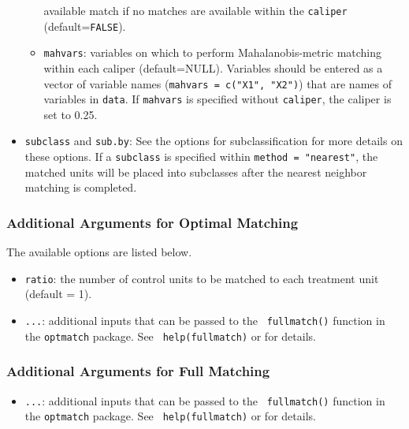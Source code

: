 \begin{itemize}
\begin{itemize}
    available match if no matches are available within the
    \texttt{caliper} (default={\tt FALSE}).
  \item \texttt{mahvars}: variables on which to perform
    Mahalanobis-metric matching within each caliper (default=NULL).
    Variables should be entered as a vector of variable names
    (\texttt{mahvars = c("X1", "X2")}) that are names of variables in
    \texttt{data}.  If \texttt{mahvars} is specified without
    \texttt{caliper}, the caliper is set to 0.25.
  \end{itemize}
\item \texttt{subclass} and \texttt{sub.by}: See the options for
  subclassification for more details on these options.  If a
  \texttt{subclass} is specified within \texttt{method = "nearest"},
  the matched units will be placed into subclasses after the nearest
  neighbor matching is completed.
\end{itemize}

\subsubsection{Additional Arguments for Optimal Matching}
\label{subsubsec:inputs-optimal}

The available options are listed below.
\begin{itemize}
\item {\tt ratio}: the number of control units to be matched
  to each treatment unit (default = 1).
\item {\tt ...}: additional inputs that can be passed to the {\tt
    fullmatch()} function in the {\tt optmatch} package. See {\tt
    help(fullmatch)} or
  for details.
\end{itemize}

\subsubsection{Additional Arguments for Full Matching}
\label{subsubsec:inputs-full}

\begin{itemize}
\item {\tt ...}: additional inputs that can be passed to the {\tt
    fullmatch()} function in the {\tt optmatch} package. See {\tt
    help(fullmatch)} or
  for details.
\end{itemize}

